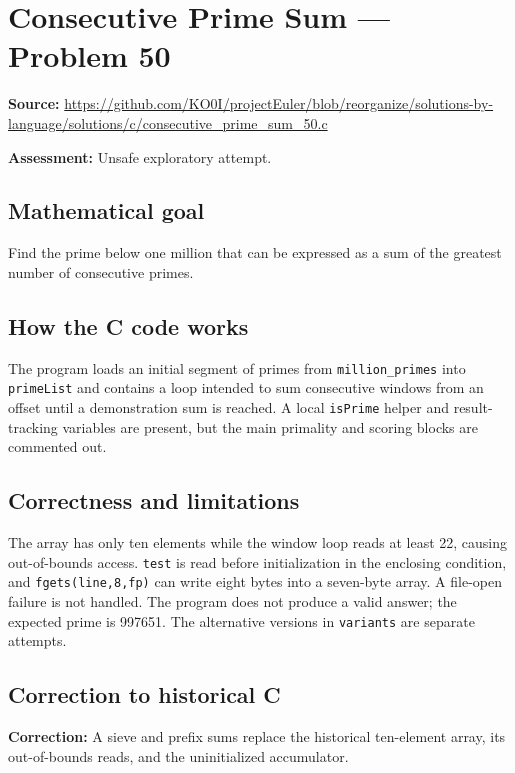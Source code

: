 \section{Consecutive Prime Sum --- Problem 50}
\label{prob:50}
\noindent\textbf{Source:} \url{https://github.com/KO0I/projectEuler/blob/reorganize/solutions-by-language/solutions/c/consecutive_prime_sum_50.c}

\noindent\textbf{Assessment:} Unsafe exploratory attempt.

\subsection*{Mathematical goal}
Find the prime below one million that can be expressed as a sum of the greatest number of consecutive primes.

\subsection*{How the C code works}
The program loads an initial segment of primes from \verb|million_primes| into \verb|primeList| and contains a loop intended to sum consecutive windows from an offset until a demonstration sum is reached. A local \verb|isPrime| helper and result-tracking variables are present, but the main primality and scoring blocks are commented out.

\subsection*{Correctness and limitations}
The array has only ten elements while the window loop reads at least 22, causing out-of-bounds access. \verb|test| is read before initialization in the enclosing condition, and \verb|fgets(line,8,fp)| can write eight bytes into a seven-byte array. A file-open failure is not handled. The program does not produce a valid answer; the expected prime is 997651. The alternative versions in \verb|variants| are separate attempts.


\subsection*{Correction to historical C}
{\color{red}\textbf{Correction:} A sieve and prefix sums replace the historical ten-element array, its out-of-bounds reads, and the uninitialized accumulator.}
